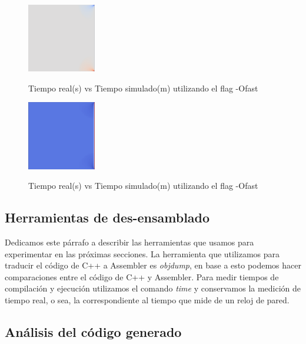 \begin{figure}[!htbp]
\caption{Tiempo real(s) vs Tiempo simulado(m) utilizando el flag -Ofast}
\includegraphics[width=3cm]{imagenes/v.png}
\label{fig:v}
\end{figure}

\begin{figure}[!htbp]
\caption{Tiempo real(s) vs Tiempo simulado(m) utilizando el flag -Ofast}
\includegraphics[width=3cm]{imagenes/u.png}
\label{fig:u}
\end{figure}

\subsection{Herramientas de des-ensamblado}

Dedicamos este párrafo a describir las herramientas que usamos para experimentar en las próximas secciones. La herramienta que utilizamos para traducir el código de C++ a Assembler es \textit{objdump}, en base a esto podemos hacer comparaciones entre el código de C++ y Assembler. Para medir tiempos de compilación y ejecución utilizamos el comando \textit{time} y conservamos la medición de tiempo real, o sea, la correspondiente al tiempo que mide de un reloj de pared.

\subsection{Análisis del código generado}

